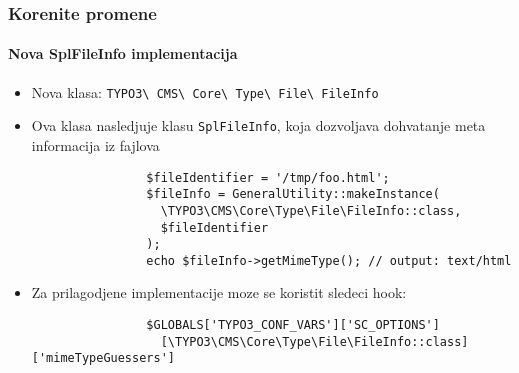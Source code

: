 
\begin{frame}[fragile]
	\frametitle{Korenite promene}
	\framesubtitle{Nova SplFileInfo implementacija}

	\lstset{basicstyle=\smaller\ttfamily}

	\begin{itemize}

		\item Nova klasa:
			\texttt{TYPO3\textbackslash
				CMS\textbackslash
				Core\textbackslash
				Type\textbackslash
				File\textbackslash
				FileInfo}

		\item Ova klasa nasledjuje klasu \texttt{SplFileInfo}, koja dozvoljava dohvatanje meta informacija iz fajlova

			\begin{lstlisting}
				$fileIdentifier = '/tmp/foo.html';
				$fileInfo = GeneralUtility::makeInstance(
				  \TYPO3\CMS\Core\Type\File\FileInfo::class,
				  $fileIdentifier
				);
				echo $fileInfo->getMimeType(); // output: text/html
			\end{lstlisting}

		\item Za prilagodjene implementacije moze se koristit sledeci hook:

			\begin{lstlisting}
				$GLOBALS['TYPO3_CONF_VARS']['SC_OPTIONS']
				  [\TYPO3\CMS\Core\Type\File\FileInfo::class]['mimeTypeGuessers']
			\end{lstlisting}

	\end{itemize}

\end{frame}


